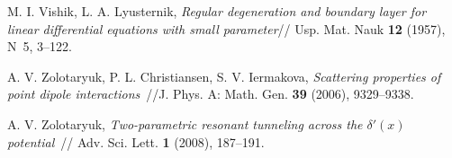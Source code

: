 \documentclass[11pt,english]{amsart}%
\begin{document}
\begin{thebibliography}{99}
M. I. Vishik, L. A. Lyusternik,
{\it  Regular degeneration and boundary layer for linear differential
    equations with small parameter}// Usp. Mat. Nauk \textbf{12} (1957), N~5, 3--122.



 A. V. Zolotaryuk, P. L. Christiansen, S. V. Iermakova,
\textit{Scattering properties of point dipole interactions}~//J. Phys. A: Math. Gen.
\textbf{39} (2006), 9329--9338.

A. V. Zolotaryuk, \textit{Two-parametric resonant tunneling across the $\delta'(x)$
potential}~// Adv. Sci. Lett. \textbf{1} (2008), 187--191.


\end{thebibliography}

\end{document}
